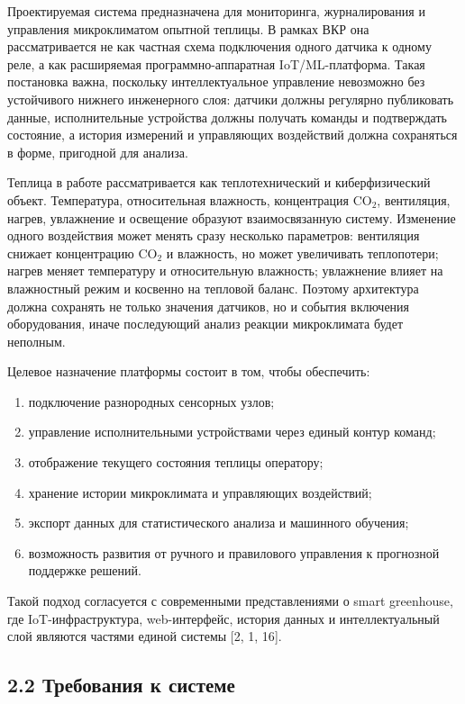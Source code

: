 \documentclass[a4paper,14pt]{extarticle}
\providecommand{\tightlist}{%
  \setlength{\itemsep}{0pt}\setlength{\parskip}{0pt}}
\begin{document}
Проектируемая система предназначена для мониторинга, журналирования и
управления микроклиматом опытной теплицы. В рамках ВКР она
рассматривается не как частная схема подключения одного датчика к одному
реле, а как расширяемая программно-аппаратная IoT/ML-платформа. Такая
постановка важна, поскольку интеллектуальное управление невозможно без
устойчивого нижнего инженерного слоя: датчики должны регулярно
публиковать данные, исполнительные устройства должны получать команды и
подтверждать состояние, а история измерений и управляющих воздействий
должна сохраняться в форме, пригодной для анализа.

Теплица в работе рассматривается как теплотехнический и киберфизический
объект. Температура, относительная влажность, концентрация CO\(_2\),
вентиляция, нагрев, увлажнение и освещение образуют взаимосвязанную
систему. Изменение одного воздействия может менять сразу несколько
параметров: вентиляция снижает концентрацию CO\(_2\) и влажность, но
может увеличивать теплопотери; нагрев меняет температуру и относительную
влажность; увлажнение влияет на влажностный режим и косвенно на тепловой
баланс. Поэтому архитектура должна сохранять не только значения
датчиков, но и события включения оборудования, иначе последующий анализ
реакции микроклимата будет неполным.

Целевое назначение платформы состоит в том, чтобы обеспечить:

\begin{enumerate}
\def\labelenumi{\arabic{enumi})}
\tightlist
\item
  подключение разнородных сенсорных узлов;
\item
  управление исполнительными устройствами через единый контур команд;
\item
  отображение текущего состояния теплицы оператору;
\item
  хранение истории микроклимата и управляющих воздействий;
\item
  экспорт данных для статистического анализа и машинного обучения;
\item
  возможность развития от ручного и правилового управления к прогнозной
  поддержке решений.
\end{enumerate}

Такой подход согласуется с современными представлениями о smart
greenhouse, где IoT-инфраструктура, web-интерфейс, история данных и
интеллектуальный слой являются частями единой системы {[}2, 1, 16{]}.

\hypertarget{ux442ux440ux435ux431ux43eux432ux430ux43dux438ux44f-ux43a-ux441ux438ux441ux442ux435ux43cux435}{%
\subsection{2.2 Требования к
системе}\label{ux442ux440ux435ux431ux43eux432ux430ux43dux438ux44f-ux43a-ux441ux438ux441ux442ux435ux43cux435}}
\end{document}
